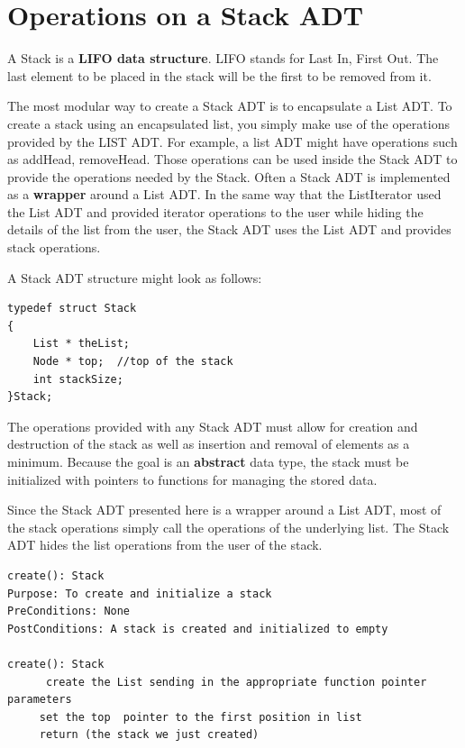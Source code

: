 \section{Operations on a Stack ADT}
    A Stack is a \textbf{LIFO data structure}. LIFO stands for Last In, First Out. The last element to be placed in the stack will be the first to be removed from it.   
    
    The most modular way to create a Stack ADT is to encapsulate a List ADT. 
To create a stack using an encapsulated list, you simply make use of the operations provided by the LIST ADT. For example, a list ADT might have operations such as addHead, removeHead. Those operations can be used inside the Stack ADT to provide the operations needed by the Stack. 
    Often a Stack ADT is implemented as a \textbf{wrapper}  around a List ADT.   In the same way that the ListIterator used the List ADT and provided  iterator operations to the user while hiding the details of the list from the user,  the Stack ADT uses the List ADT and provides stack operations.

A Stack ADT structure might look as follows:

\begin{lstlisting}
typedef struct Stack
{
    List * theList;
    Node * top;  //top of the stack
    int stackSize;
}Stack;

\end{lstlisting}

The operations provided with any Stack ADT must allow for creation and destruction of the stack as well as insertion and removal of elements as a minimum.   Because the goal is an \textbf{abstract} data type,  the stack must  be initialized with pointers to functions for managing the stored data.   

Since the Stack ADT presented here is a wrapper around a List ADT, most of the stack operations simply call the operations of the underlying list.  The Stack ADT hides the list operations from the user of the stack.

\begin{lstlisting}
create(): Stack
Purpose: To create and initialize a stack
PreConditions: None
PostConditions: A stack is created and initialized to empty

create(): Stack
      create the List sending in the appropriate function pointer parameters
     set the top  pointer to the first position in list
     return (the stack we just created)
\end{lstlisting}


